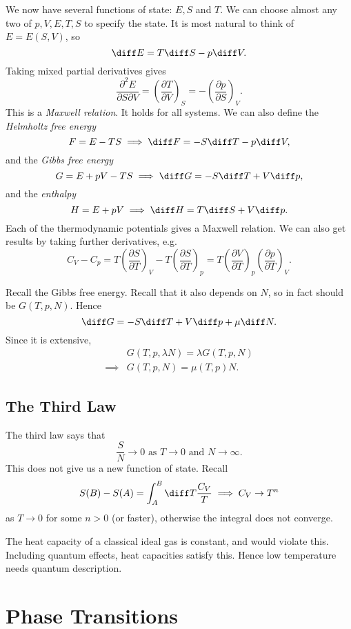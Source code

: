 \documentclass[12pt]{article}
\begin{document}
We now have several functions of state: $E, S$ and $T$. We can choose almost any two of $p, V, E, T, S$ to specify the state. It is most natural to think of $E = E(S, V)$, so
\[
\diff E = T \diff S - p \diff V.
\]
Taking mixed partial derivatives gives
\[
\frac{\partial^2 E}{\partial S \partial V} = \left( \frac{\partial T}{\partial V}\right)_S = - \left( \frac{\partial p}{\partial S} \right)_V.
\]
This is a \emph{Maxwell relation}. It holds for all systems. We can also define the \emph{Helmholtz free energy}
\[
F = E - TS \implies \diff F = - S \diff T - p \diff V,
\]
and the \emph{Gibbs free energy}
\[
G = E + pV - T S \implies \diff G = - S \diff T + V \diff p,
\]
and the \emph{enthalpy}
\[
H = E + p V \implies \diff H = T \diff S + V \diff p.
\]
Each of the thermodynamic potentials gives a Maxwell relation. We can also get results by taking further derivatives, e.g.
\[
C_V - C_p = T \left( \frac{\partial S}{\partial T} \right)_V - T \left(\frac{\partial S}{\partial T} \right)_p = T \left( \frac{\partial V}{\partial T} \right)_p \left( \frac{\partial p}{\partial T} \right)_V.
\]
\begin{remark}
	Recall the Gibbs free energy. Recall that it also depends on $N$, so in fact should be $G(T, p, N)$. Hence
	\[
		\diff G = - S \diff T + V \diff p + \mu \diff N.
	\]
	Since it is extensive,
	\begin{align*}
		 & G(T, p, \lambda N) = \lambda G(T, p, N) \\
		\implies & G(T, p, N) = \mu(T, p) N.
	\end{align*}
\end{remark}

\subsection{The Third Law}
\label{sub:law3}

The third law says that
\[
	\frac{S}{N} \to 0 \text{ as } T \to 0 \text{ and } N \to \infty.
\]
This does not give us a new function of state. Recall
\[
S(B) - S(A) = \int_A^B \diff T \frac{C_V}{T} \implies C_V \to T^n
\]
as $T\to 0$ for some $n > 0$ (or faster), otherwise the integral does not converge.

The heat capacity of a classical ideal gas is constant, and would violate this. Including quantum effects, heat capacities satisfy this. Hence low temperature needs quantum description.

\newpage

\section{Phase Transitions}
\label{sub:pt}
\end{document}
